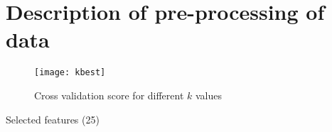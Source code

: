 
\section{Description of pre-processing of data}%
\label{sec:desc-prep}


\begin{figure}[H]
    \centering
    \texttt{[image: kbest]}
    \caption{Cross validation score for different $k$ values}%
    \label{fig:feature_cross}
\end{figure}

\begin{table}[H]
    \centering
    \caption{Selected features (25)}%
    \label{tab:features}
    
\end{table}